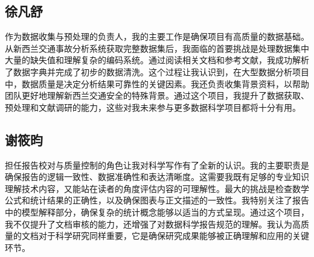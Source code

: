\documentclass[12pt,a4paper]{article}
\begin{document}
\subsection{徐凡舒}

作为数据收集与预处理的负责人，我的主要工作是确保项目有高质量的数据基础。从新西兰交通事故分析系统获取完整数据集后，我面临的首要挑战是处理数据集中大量的缺失值和理解复杂的编码系统。通过阅读相关文档和参考文献，我成功解析了数据字典并完成了初步的数据清洗。这个过程让我认识到，在大型数据分析项目中，数据质量是决定分析结果可靠性的关键因素。我还负责收集背景资料，以帮助团队更好地理解新西兰交通安全的特殊背景。通过这个项目，我提升了数据获取、预处理和文献调研的能力，这些对我未来参与更多数据科学项目都将十分有用。

\subsection{谢筱昀}

担任报告校对与质量控制的角色让我对科学写作有了全新的认识。我的主要职责是确保报告的逻辑一致性、数据准确性和表达清晰度。这需要我既有足够的专业知识理解技术内容，又能站在读者的角度评估内容的可理解性。最大的挑战是检查数学公式和统计结果的正确性，以及确保图表与正文描述的一致性。我特别关注了报告中的模型解释部分，确保复杂的统计概念能够以适当的方式呈现。通过这个项目，我不仅提升了文档审核的能力，还增强了对数据科学报告规范的理解。我认为高质量的文档对于科学研究同样重要，它是确保研究成果能够被正确理解和应用的关键环节。
\end{document}
